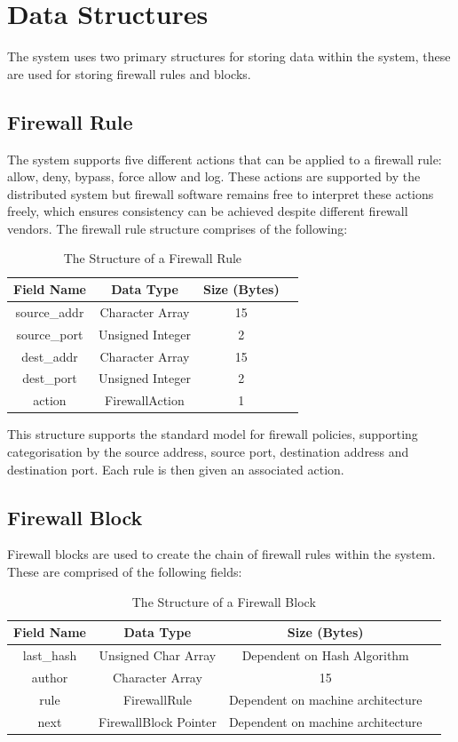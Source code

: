 \documentclass[a4paper, 11pt]{report}
\begin{document}
\section{Data Structures}
The system uses two primary structures for storing data within the system, these are used for storing firewall rules and blocks.

\subsection{Firewall Rule} \label{rule}
The system supports five different actions that can be applied to a firewall rule: allow, deny, bypass, force allow and log.  These actions are supported by the distributed system but firewall software remains free to interpret these actions freely, which ensures consistency can be achieved despite different firewall vendors.
The firewall rule structure comprises of the following:

\begin{table}[H]
\centering
\begin{tabular}{ |c|c|c|c| } 
\hline
Field Name & Data Type & Size (Bytes) \\
\hline
source_addr & Character Array & 15 \\
source_port & Unsigned Integer & 2 \\
dest_addr & Character Array & 15 \\
dest_port & Unsigned Integer & 2 \\
action & FirewallAction & 1 \\
\hline
\end{tabular}
\caption{The Structure of a Firewall Rule}
\label{tab:rulestr}
\end{table}

This structure supports the standard model for firewall policies, supporting categorisation by the source address, source port, destination address and destination port. Each rule is then given an associated action.

\subsection{Firewall Block} \label{firewallblock}
Firewall blocks are used to create the chain of firewall rules within the system. These are comprised of the following fields:

\begin{table}[H]
\centering
\begin{tabular}{ |c|c|c|c| } 
\hline
Field Name & Data Type & Size (Bytes) \\
\hline
last_hash & Unsigned Char Array & Dependent on Hash Algorithm \\ 
author & Character Array & 15 \\
rule & FirewallRule & Dependent on machine architecture \\
next & FirewallBlock Pointer & Dependent on machine architecture \\
\hline
\end{tabular}
\caption{The Structure of a Firewall Block}
\label{tab:firewallblock}
\end{table}
\end{document}
